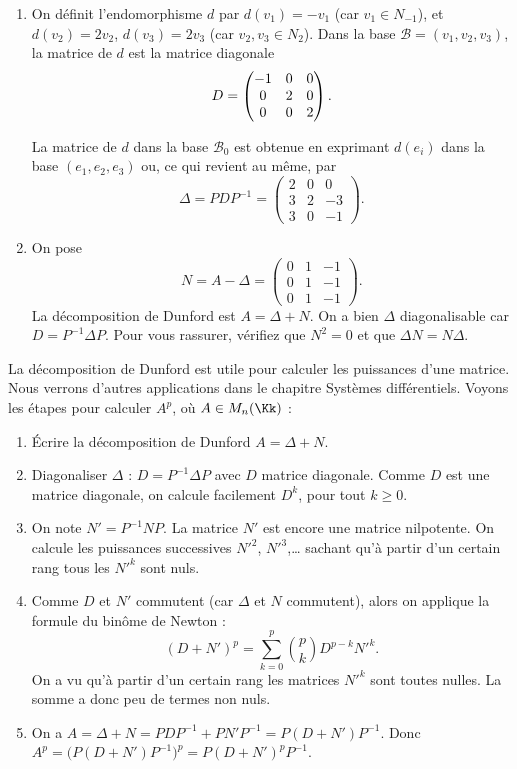 \documentclass[12pt, class=report,crop=false]{standalone}
\begin{document}
\begin{exemple}
\begin{enumerate}
  
  \item  On définit l'endomorphisme $d$  par $d(v_1)=-v_1$ (car $v_1 \in N_{-1}$),
  et $d(v_2)= 2v_2$, $d(v_3) = 2v_3$ (car $v_2,v_3 \in N_2$).
  Dans la base $\mathcal{B} = (v_1,v_2,v_3)$, la matrice de $d$ est la matrice diagonale
  $$D = \begin{pmatrix}-1&0&0\cr 0&2&0\cr 0&0&2\end{pmatrix}.$$
  
  
  La matrice de $d$ dans la base $\mathcal{B}_0$ est
  obtenue en exprimant $d(e_i)$ dans la base $(e_1,e_2,e_3)$ ou, ce qui revient au même, par 
  $$\Delta = P D P^{-1} = \begin{pmatrix}2 & 0 & 0 \\3 & 2 & -3 \\3 & 0 & -1\end{pmatrix}.$$
  
  \item On pose 
  $$N = A - \Delta=\begin{pmatrix}  0 & 1 & -1 \\0 & 1 & -1 \\0 & 1 & -1\end{pmatrix}.$$
  La décomposition de Dunford est $A = \Delta + N$. 
  On a bien $\Delta$ diagonalisable car $D = P^{-1}\Delta P$. Pour vous rassurer, vérifiez 
  que $N^2 = 0$ et que $\Delta N = N\Delta$. 
  \end{enumerate}
\end{exemple}

 
\bigskip


La décomposition de Dunford est utile pour calculer les puissances d'une matrice.
Nous verrons d'autres applications dans le chapitre \og{}Systèmes différentiels\fg{}.
Voyons les étapes pour calculer $A^p$, où  $A\in M_n(\Kk)$ :
\begin{enumerate}
  \item \'Ecrire la décomposition de Dunford $A = \Delta + N$.  
  
  \item Diagonaliser $\Delta$ : $D = P^{-1}\Delta P$ avec $D$ matrice diagonale.
  Comme $D$ est une matrice diagonale, on calcule facilement $D^k$, pour tout $k\ge0$.
  
  \item On note $N' = P^{-1}NP$. La matrice $N'$ est encore une matrice nilpotente. 
  On calcule les puissances successives $N'^2$, $N'^3$,\ldots{} sachant qu'à partir d'un certain rang tous les $N'^k$ sont nuls.
  
  \item Comme $D$ et $N'$ commutent (car $\Delta$ et $N$ commutent), alors 
  on applique la formule du binôme de Newton :
$$(D+N')^p=\sum_{k=0}^p \binom{p}{k} D^{p-k} N'^{k}.$$
On a vu qu'à partir d'un certain rang les matrices $N'^k$ sont toutes nulles. La somme a donc peu de termes non nuls.

  \item On a $A = \Delta + N = P D P^{-1} + P N' P^{-1} = P(D+N')P^{-1}$.
  Donc $A^p = \big(P(D+N')P^{-1}\big)^p = P (D+N')^p P^{-1}$.
\end{enumerate}
\end{document}
